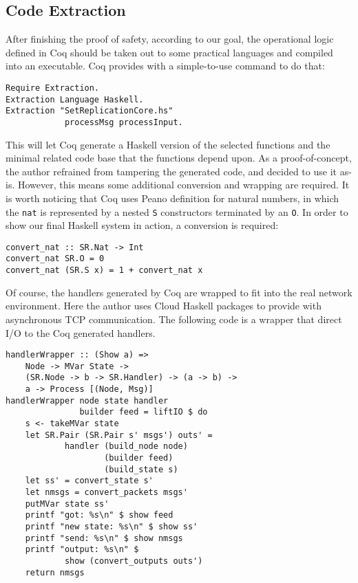 \documentclass[twocolumn]{article}
\begin{document}
\subsection{Code Extraction}
After finishing the proof of safety, according to our goal, the operational
logic defined in Coq should be taken out to some practical languages and
compiled into an executable. Coq provides with a simple-to-use command to do that:
\begin{center}
\small
\begin{verbatim}
Require Extraction.
Extraction Language Haskell.
Extraction "SetReplicationCore.hs"
            processMsg processInput.
\end{verbatim}
\end{center}
This will let Coq generate a Haskell version of the selected functions and the
minimal related code base that the functions depend upon. As a
proof-of-concept, the author refrained from tampering the generated code, and
decided to use it as-is. However, this means some additional conversion and
wrapping are required. It is worth noticing that Coq uses Peano definition for
natural numbers, in which the \texttt{nat} is represented by a nested
\texttt{S} constructors terminated by an \texttt{O}. In order to show our final
Haskell system in action, a conversion is required:
\begin{center}
\small
\begin{verbatim}
convert_nat :: SR.Nat -> Int
convert_nat SR.O = 0
convert_nat (SR.S x) = 1 + convert_nat x
\end{verbatim}
\end{center}
Of course, the handlers generated by Coq are wrapped to fit into the real
network environment. Here the author uses Cloud Haskell packages to provide
with asynchronous TCP communication. The following code is a wrapper that
direct I/O to the Coq generated handlers.
\begin{center}
\small
\begin{verbatim}
handlerWrapper :: (Show a) =>
    Node -> MVar State ->
    (SR.Node -> b -> SR.Handler) -> (a -> b) ->
    a -> Process [(Node, Msg)]
handlerWrapper node state handler
               builder feed = liftIO $ do
    s <- takeMVar state
    let SR.Pair (SR.Pair s' msgs') outs' =
            handler (build_node node)
                    (builder feed)
                    (build_state s)
    let ss' = convert_state s'
    let nmsgs = convert_packets msgs'
    putMVar state ss'
    printf "got: %s\n" $ show feed
    printf "new state: %s\n" $ show ss'
    printf "send: %s\n" $ show nmsgs
    printf "output: %s\n" $
            show (convert_outputs outs')
    return nmsgs
\end{verbatim}
\end{center}
\end{document}
